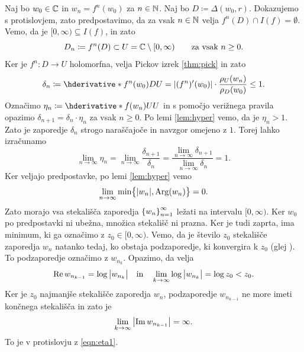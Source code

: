 \begin{dokaz}
    Naj bo \(w_0 \in \mathbb C\) in \(w_n = f^n (w_0)\) za \(n \in \mathbb N\). Naj bo \(D \coloneq \Delta (w_0, r)\). Dokazujemo s protislovjem, zato predpostavimo, da za vsak \(n \in \mathbb N\) velja \(f^n (D) \cap I (f) = \emptyset\). Vemo, da je \([0, \infty) \subseteq I (f)\), in zato
    \[D_n \coloneq f^n (D) \subset U = \mathbb C \setminus [0, \infty) \qquad \text{za vsak } n \geq 0.\]
    Ker je \(f^n \colon D \to U\) holomorfna, velja Pickov izrek \ref{thm:pick} in zato
    \[\delta_n \coloneq \hder{f^n (w_0)}{D}{U} = |(f^n)' (w_0)| \cdot \frac{\rho_U (w_n)}{\rho_D (w_0)} \leq 1.\]
    Označimo \(\eta_n \coloneq \hder{f (w_n)}{U}{U}\) in s pomočjo verižnega pravila opazimo \(\delta_{n + 1} = \delta_n \cdot \eta_n\) za vsak \(n \geq 0\). Po lemi \ref{lem:hyper} vemo, da je \(\eta_n > 1\). Zato je zaporedje \(\delta_n\) strogo naraščajoče in navzgor omejeno z \(\num{1}\). Torej lahko izračunamo
    \[\lim_{n \to \infty} \eta_n = \lim_{n \to \infty} \frac{\delta_{n + 1}}{\delta_n} = \frac{\lim_{n \to \infty} \delta_{n + 1}}{\lim_{n \to \infty} \delta_n} = 1.\]
    Ker veljajo predpostavke, po lemi \ref{lem:hyper} vemo
    \begin{equation} \label{eqn:eta1}
        \lim_{n \to \infty} \min \bigl\{ |w_n|, \operatorname{Arg} (w_n) \bigr\} = 0.
    \end{equation}
    Zato morajo vsa stekališča zaporedja \(\left\{ w_n \right\}_{n = 1}^{\infty}\) ležati na intervalu \([0, \infty)\). Ker \(w_0\) po predpostavki ni ubežna, množica stekališč ni prazna. Ker je tudi zaprta, ima minimum, ki ga označimo z \(z_0 \in [0, \infty)\). Vemo, da je število \(z_0\) stekališče zaporedja \(w_n\) natanko tedaj, ko obstaja podzaporedje, ki konvergira k \(z_0\) (glej \cite[izrek 11]{Globevnik_2012}). To podzaporedje označimo z \(w_{n_{k}}\). Opazimo, da velja
    \[\operatorname{Re} w_{n_{k - 1}} = \log \, \bigl| w_{n_{k}} \bigr| \quad \text{in} \quad \lim_{k \to \infty} \log \, \bigl| w_{n_{k}} \bigr| = \log z_0 < z_0.\]
    Ker je \(z_0\) najmanjše stekališče zaporedja \(w_n\), podzaporedje \(w_{n_{k - 1}}\) ne more imeti končnega stekališča in zato je
    \[\lim_{k \to \infty} \, \bigl|\operatorname{Im} w_{n_{k-1}}\bigr| = \infty.\]
    To je v protislovju z \eqref{eqn:eta1}.
\end{dokaz}



